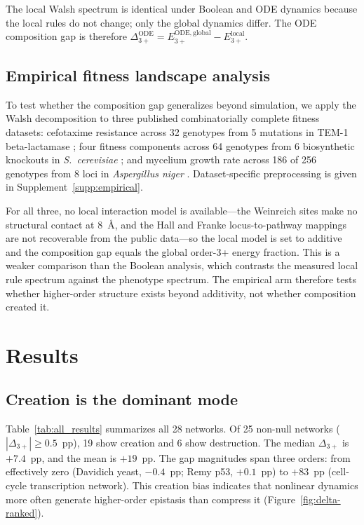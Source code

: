 \documentclass[10pt]{article}
\begin{document}
The local Walsh spectrum is identical under Boolean and ODE dynamics
because the local rules do not change; only the global dynamics
differ. The ODE composition gap is therefore
$\Delta_{3+}^{\mathrm{ODE}} = E_{3+}^{\mathrm{ODE,global}} - E_{3+}^{\mathrm{local}}$.


\subsection{Empirical fitness landscape analysis}
\label{sec:empirical-method}

To test whether the composition gap generalizes beyond simulation, we
apply the Walsh decomposition to three published combinatorially
complete fitness datasets: cefotaxime resistance across 32 genotypes
from 5 mutations in TEM-1 beta-lactamase
\citep{weinreich2006darwinian}; four fitness components across 64
genotypes from 6 biosynthetic knockouts in \emph{S.~cerevisiae}
\citep{hall2010fitness}; and mycelium growth rate across 186 of 256
genotypes from 8 loci in \emph{Aspergillus niger}
\citep{franke2011evolutionary}. Dataset-specific preprocessing is given
in Supplement~\ref{supp:empirical}.

For all three, no local interaction model is available---the Weinreich
sites make no structural contact at 8~\AA, and the Hall and Franke
locus-to-pathway mappings are not recoverable from the public
data---so the local model is set to additive and the composition gap
equals the global order-3+ energy fraction. This is a weaker comparison
than the Boolean analysis, which contrasts the measured local rule
spectrum against the phenotype spectrum. The empirical arm therefore
tests whether higher-order structure exists beyond additivity, not
whether composition created it.


\section{Results}
\label{sec:results}

\subsection{Creation is the dominant mode}

Table~\ref{tab:all_results} summarizes all 28 networks. Of 25
non-null networks ($|\Delta_{3+}| \geq 0.5$~pp), 19 show creation
and 6 show destruction. The median $\Delta_{3+}$ is $+7.4$~pp, and
the mean is $+19$~pp. The gap magnitudes span three orders: from
effectively zero (Davidich yeast, $-0.4$~pp; Remy p53, $+0.1$~pp)
to $+83$~pp (cell-cycle transcription network). This creation bias
indicates that nonlinear dynamics more often generate higher-order
epistasis than compress it (Figure~\ref{fig:delta-ranked}).
\end{document}
